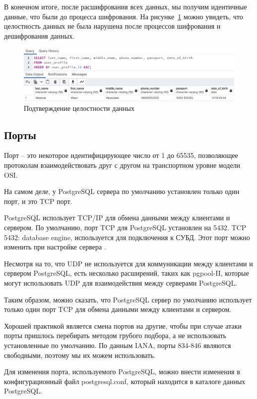 В конечном итоге, после расшифрования всех данных, мы получим идентичные данные, что были до процесса шифрования. На рисунке~\ref{fig:fig20} можно увидеть, что целостность данных не была нарушена после процессов шифрования и дешифрования данных.

\begin{figure}
  \includegraphics[scale=0.456]{inc/table_user_profile}
  \caption{Подтверждение целостности данных}
  \label{fig:fig20}
\end{figure}



\subsection{Порты}

Порт – это некоторое идентифицирующее число от 1 до 65535, позволяющее протоколам взаимодействовать друг с другом на транспортном уровне модели OSI.

На самом деле, у PostgreSQL сервера по умолчанию установлен только один порт, и это TCP порт.

PostgreSQL использует TCP/IP для обмена данными между клиентами и сервером. По умолчанию, порт TCP для PostgreSQL установлен на 5432. TCP 5432: database engine, используется для подключения к СУБД. Этот порт можно изменить при настройке сервера \cite{online7}.

Несмотря на то, что UDP не используется для коммуникации между клиентами и сервером PostgreSQL, есть несколько расширений, таких как pgpool-II, которые могут использовать UDP для взаимодействия между серверами PostgreSQL.

Таким образом, можно сказать, что PostgreSQL сервер по умолчанию использует только один порт TCP для обмена данными между клиентами и сервером.

Хорошей практикой является смена портов на другие, чтобы при случае атаки порты пришлось перебирать методом грубого подбора, а не использовать установленные по умолчанию. По данным IANA, порты 834-846 являются свободными, поэтому мы их можем использовать.

Для изменения порта, используемого PostgreSQL, можно внести изменения в конфигурационный файл postgresql.conf, который находится в каталоге данных PostgreSQL.

